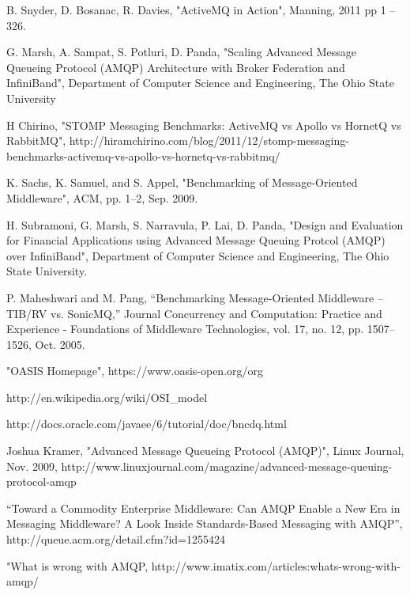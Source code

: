 \documentclass{thesis}
\begin{document}
\begin{singlespace}
\begin{thebibliography}{99}

 B. Snyder, D. Bosanac, R. Davies, "ActiveMQ in Action", Manning, 2011 pp 1 – 326.

 G. Marsh, A. Sampat, S. Potluri, D. Panda, "Scaling Advanced Message Queueing Protocol (AMQP) Architecture with Broker Federation and InfiniBand", Department of Computer Science and Engineering, The Ohio State University

 H Chirino, "STOMP Messaging Benchmarks: ActiveMQ vs Apollo vs HornetQ vs RabbitMQ", http://hiramchirino.com/blog/2011/12/stomp-messaging-benchmarks-activemq-vs-apollo-vs-hornetq-vs-rabbitmq/

 K. Sachs, K. Samuel, and S. Appel, "Benchmarking of Message-Oriented Middleware", ACM, pp. 1–2, Sep. 2009.

 H. Subramoni, G. Marsh, S. Narravula, P. Lai, D. Panda, "Design and Evaluation for Financial Applications using Advanced Message Queuing Protcol (AMQP) over InfiniBand", Department of Computer Science and Engineering, The Ohio State University.

 P. Maheshwari and M. Pang, “Benchmarking Message-Oriented Middleware – TIB/RV vs. SonicMQ,” Journal Concurrency and Computation: Practice and Experience - Foundations of Middleware Technologies, vol. 17, no. 12, pp. 1507–1526, Oct. 2005.

 "OASIS Homepage", https://www.oasis-open.org/org

 http://en.wikipedia.org/wiki/OSI_model

 http://docs.oracle.com/javaee/6/tutorial/doc/bncdq.html

 Joshua Kramer, "Advanced Message Queueing Protocol (AMQP)", Linux Journal, Nov. 2009, http://www.linuxjournal.com/magazine/advanced-message-queuing-protocol-amqp

 “Toward a Commodity Enterprise Middleware: Can AMQP Enable a New Era in Messaging Middleware? A Look Inside Standards-Based Messaging with AMQP”, http://queue.acm.org/detail.cfm?id=1255424

 "What is wrong with AMQP, http://www.imatix.com/articles:whats-wrong-with-amqp/


\end{thebibliography}
\end{singlespace}
\end{document}

